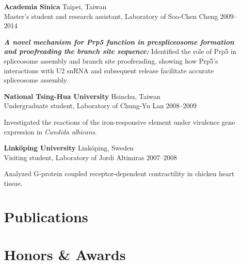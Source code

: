 \documentclass[letterpaper,11pt]{cv}
\begin{document}
\begin{entrylist}
\item \textbf{Academia Sinica} \hfill Taipei, Taiwan\\
Master's student and research assistant, Laboratory of Soo-Chen Cheng \hfill
2009--2014
\begin{detaillist}
    \item \textit{\textbf{A novel mechanism for Prp5 function in prespliceosome formation and proofreading the branch site sequence: }}Identified the role of Prp5 in spliceosome assembly and branch site proofreading, showing how Prp5's interactions with U2 snRNA and subsequent release facilitate accurate spliceosome assembly.
\end{detaillist}

\item \textbf{National Tsing-Hua University} \hfill Hsinchu, Taiwan\\
Undergraduate student, Laboratory of Chung-Yu Lan \hfill
2008--2009
\begin{detaillist}
    \item Investigated the reactions of the iron-responsive element under virulence gene expression in \textit{Candida albicans}.
\end{detaillist}

\item \textbf{Linköping University} \hfill Linköping, Sweden\\
Visiting student, Laboratory of Jordi Altimiras \hfill
2007--2008
\begin{detaillist}
    \item Analyzed G-protein coupled receptor-dependent contractility in chicken heart tissue.
\end{detaillist}

\end{entrylist}


\section{Publications}

\nocite{*}

\printbibliography[
    keyword={primary},
    heading=subbibliography,
    title={First authorship \footnotesize (* Equal contribution)}
    ]

\printbibliography[
    keyword={contributing},
    heading=subbibliography,
    title={Co-authorship}
    ]

\section{Honors \& Awards}
\end{document}
